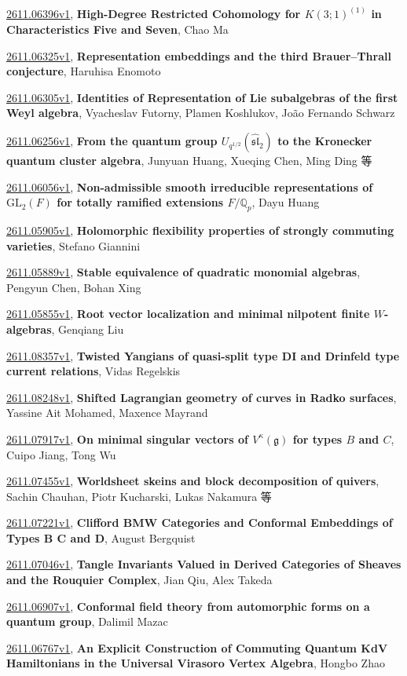 \documentclass[9pt, a4paper]{article}
\theoremstyle{plain}
\theoremstyle{definition}
\theoremstyle{remark}
\newcommand{\arxiv}[3]{\href{https://arxiv.org/abs/#1}{#1}, \textbf{\textcolor{arxivblue}{#2}}, #3}
\begin{document}
\arxiv{2611.06396v1}{High-Degree Restricted Cohomology for $K(3;1)^{(1)}$ in Characteristics Five and Seven}{Chao Ma}

\arxiv{2611.06325v1}{Representation embeddings and the third Brauer--Thrall conjecture}{Haruhisa Enomoto}

\arxiv{2611.06305v1}{Identities of Representation of Lie subalgebras of the first Weyl algebra}{Vyacheslav Futorny, Plamen Koshlukov, João Fernando Schwarz}

\arxiv{2611.06256v1}{From the quantum group $U_{q^{1/2}}( {\widehat {\mathfrak{sl}}}_2 )$ to the Kronecker quantum cluster algebra}{Junyuan Huang, Xueqing Chen, Ming Ding 等}

\arxiv{2611.06056v1}{Non-admissible smooth irreducible representations of $\mathrm{GL}_2(F)$ for totally ramified extensions $F/\mathbb{Q}_p$}{Dayu Huang}

\arxiv{2611.05905v1}{Holomorphic flexibility properties of strongly commuting varieties}{Stefano Giannini}

\arxiv{2611.05889v1}{Stable equivalence of quadratic monomial algebras}{Pengyun Chen, Bohan Xing}

\arxiv{2611.05855v1}{Root vector localization and minimal nilpotent finite $W$-algebras}{Genqiang Liu}

\arxiv{2611.08357v1}{Twisted Yangians of quasi-split type DI and Drinfeld type current relations}{Vidas Regelskis}

\arxiv{2611.08248v1}{Shifted Lagrangian geometry of curves in Radko surfaces}{Yassine Ait Mohamed, Maxence Mayrand}

\arxiv{2611.07917v1}{On minimal singular vectors of $V^κ(\mathfrak{g})$ for types $B$ and $C$}{Cuipo Jiang, Tong Wu}

\arxiv{2611.07455v1}{Worldsheet skeins and block decomposition of quivers}{Sachin Chauhan, Piotr Kucharski, Lukas Nakamura 等}

\arxiv{2611.07221v1}{Clifford BMW Categories and Conformal Embeddings of Types B C and D}{August Bergquist}

\arxiv{2611.07046v1}{Tangle Invariants Valued in Derived Categories of Sheaves and the Rouquier Complex}{Jian Qiu, Alex Takeda}

\arxiv{2611.06907v1}{Conformal field theory from automorphic forms on a quantum group}{Dalimil Mazac}

\arxiv{2611.06767v1}{An Explicit Construction of Commuting Quantum KdV Hamiltonians in the Universal Virasoro Vertex Algebra}{Hongbo Zhao}
\end{document}
